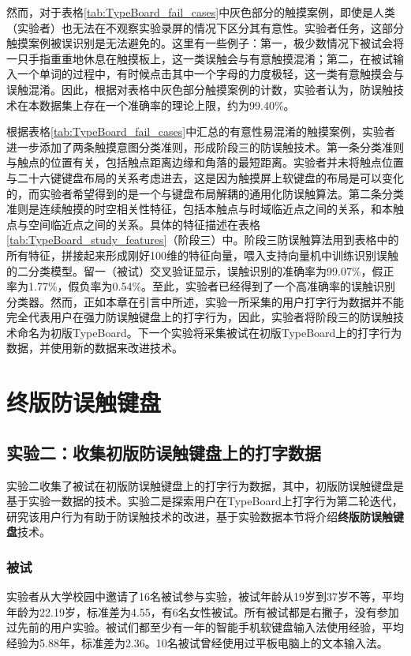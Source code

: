 然而，对于表格\ref{tab:TypeBoard_fail_cases}中灰色部分的触摸案例，即使是人类（实验者）也无法在不观察实验录屏的情况下区分其有意性。实验者任务，这部分触摸案例被误识别是无法避免的。这里有一些例子：第一，极少数情况下被试会将一只手指重重地休息在触摸板上，这一类误触会与有意触摸混淆；第二，在被试输入一个单词的过程中，有时候点击其中一个字母的力度极轻，这一类有意触摸会与误触混淆。因此，根据对表格中灰色部分触摸案例的计数，实验者认为，防误触技术在本数据集上存在一个准确率的理论上限，约为99.40\%。

根据表格\ref{tab:TypeBoard_fail_cases}中汇总的有意性易混淆的触摸案例，实验者进一步添加了两条触摸意图分类准则，形成阶段三的防误触技术。第一条分类准则与触点的位置有关，包括触点距离边缘和角落的最短距离。实验者并未将触点位置与二十六键键盘布局的关系考虑进去，这是因为触摸屏上软键盘的布局是可以变化的，而实验者希望得到的是一个与键盘布局解耦的通用化防误触算法。第二条分类准则是连续触摸的时空相关性特征，包括本触点与时域临近点之间的关系，和本触点与空间临近点之间的关系。具体的特征描述在表格\ref{tab:TypeBoard_study_features}（阶段三）中。阶段三防误触算法用到表格中的所有特征，拼接起来形成刚好100维的特征向量，喂入支持向量机中训练识别误触的二分类模型。留一（被试）交叉验证显示，误触识别的准确率为99.07\%，假正率为1.77\%，假负率为0.54\%。至此，实验者已经得到了一个高准确率的误触识别分类器。然而，正如本章在引言中所述，实验一所采集的用户打字行为数据并不能完全代表用户在强力防误触键盘上的打字行为，因此，实验者将阶段三的防误触技术命名为初版TypeBoard。下一个实验将采集被试在初版TypeBoard上的打字行为数据，并使用新的数据来改进技术。

\section{终版防误触键盘}

\subsection{实验二：收集初版防误触键盘上的打字数据}

实验二收集了被试在初版防误触键盘上的打字行为数据，其中，初版防误触键盘是基于实验一数据的技术。实验二是探索用户在TypeBoard上打字行为第二轮迭代，研究该用户行为有助于防误触技术的改进，基于实验数据本节将介绍\textbf{终版防误触键盘}技术。

\subsubsection{被试}

实验者从大学校园中邀请了16名被试参与实验，被试年龄从19岁到37岁不等，平均年龄为22.19岁，标准差为4.55，有6名女性被试。所有被试都是右撇子，没有参加过先前的用户实验。被试们都至少有一年的智能手机软键盘输入法使用经验，平均经验为5.88年，标准差为2.36。10名被试曾经使用过平板电脑上的文本输入法。

